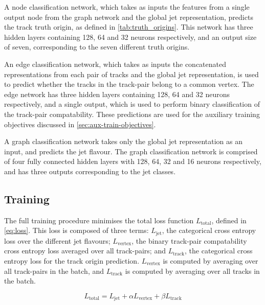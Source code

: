 A node classification network, which takes as inputs the features from a single output node from the graph network and the global jet representation, predicts the track truth origin, as defined in \cref{tab:truth_origins}.
This network has three hidden layers containing 128, 64 and 32 neurons respectively, and an output size of seven, corresponding to the seven different truth origins.

An edge classification network, which takes as inputs the concatenated representations from each pair of tracks and the global jet representation, is used to predict whether the tracks in the track-pair belong to a common vertex.
The edge network has three hidden layers containing 128, 64 and 32 neurons respectively, and a single output, which is used to perform binary classification of the track-pair compatability.
These predictions are used for the auxiliary training objectives discussed in \cref{sec:aux-train-objectives}.

A graph classification network takes only the global jet representation as an input, and predicts the jet flavour. 
The graph classification network is comprised of four fully connected hidden layers with 128, 64, 32 and 16 neurons respectively, and has three outputs corresponding to the \bcl jet classes. 



\subsection{Training}\label{sec:training}

The full \GNN training procedure minimises the total loss function $L_\text{total}$, defined in \cref{eq:loss}. 
This loss is composed of three terms: $L_\text{jet}$, the categorical cross entropy loss over the different jet flavours; $L_\text{vertex}$, the binary track-pair compatability cross entropy loss averaged over all track-pairs; and $L_\text{track}$, the categorical cross entropy loss for the track origin prediction. $L_\text{vertex}$ is computed by averaging over all track-pairs in the batch, and $L_\text{track}$ is computed by averaging over all tracks in the batch.

\begin{equation}\label{eq:loss}
    L_\text{total} = L_\text{jet} + \alpha L_\text{vertex} + \beta L_\text{track}
\end{equation}

